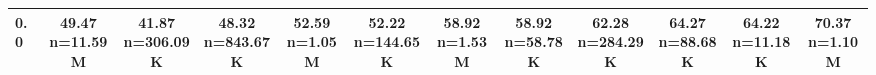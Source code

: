 \begin{table}
\begin{tabular}{lccccccccccc}
0.0 & \makecell{49.47 \\ \scriptsize n=11.59M} & \makecell{41.87 \\ \scriptsize n=306.09K} & \makecell{48.32 \\ \scriptsize n=843.67K} & \makecell{52.59 \\ \scriptsize n=1.05M} & \makecell{52.22 \\ \scriptsize n=144.65K} & \makecell{58.92 \\ \scriptsize n=1.53M} & \makecell{58.92 \\ \scriptsize n=58.78K} & \makecell{62.28 \\ \scriptsize n=284.29K} & \makecell{64.27 \\ \scriptsize n=88.68K} & \makecell{64.22 \\ \scriptsize n=11.18K} & \makecell{70.37 \\ \scriptsize n=1.10M} \\
            \bottomrule
            \end{tabular}
            \label{tab:si-disruption-matrix-1}
            \end{table}